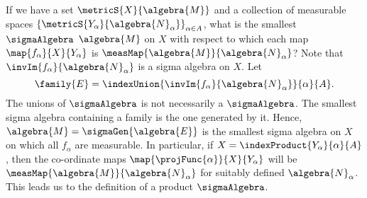 \begin{Remark}
    If we have a set $\metricS{X}{\algebra{M}}$ and a collection of measurable spaces 
    ${\lbrace\metricS{Y_{\alpha}}{\algebra{N}_{\alpha}} \rbrace }_{\alpha \in A}$, what is the smallest
    $\sigmaAlgebra$ $\algebra{M}$ on $X$ with respect to which each map $\map{f_{\alpha}}{X}{Y_{\alpha}}$ is
    $\measMap{\algebra{M}}{\algebra{N}_{\alpha}}$? 
    Note that $\invIm{f_{\alpha}}{\algebra{N}_{\alpha}}$ is a sigma algebra on $X$. Let 
    \[\family{E} = \indexUnion{\invIm{f_{\alpha}}{\algebra{N}_{\alpha}}}{\alpha}{A}.\]
    The unions of $\sigmaAlgebra$ is not necessarily a $\sigmaAlgebra$. The smallest sigma algebra containing a
    family is the one generated by it. Hence, $\algebra{M} = \sigmaGen{\algebra{E}}$ is the smallest sigma algebra
    on $X$ on which all $f_{\alpha}$ are measurable. In particular, if $X = \indexProduct{Y_{\alpha}}{\alpha}{A}$,
    then the co-ordinate maps $\map{\projFunc{\alpha}}{X}{Y_{\alpha}}$ will be
    $\measMap{\algebra{M}}{\algebra{N}_{\alpha}}$ for suitably defined $\algebra{N}_{\alpha}$. This leads us to
    the definition of a product $\sigmaAlgebra$.
\end{Remark}

